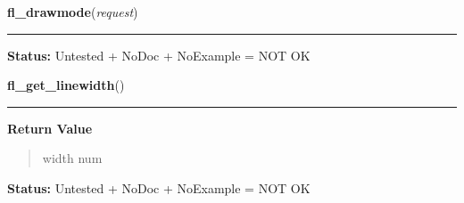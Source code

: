     \label{xformslib:library:fl_drawmode}

    \vspace{0.5ex}

\hspace{.8\funcindent}\begin{boxedminipage}{\funcwidth}

    \raggedright \textbf{fl\_drawmode}(\textit{request})

    \vspace{-1.5ex}

    \rule{\textwidth}{0.5\fboxrule}
\setlength{\parskip}{2ex}
\setlength{\parskip}{1ex}
\textbf{Status:} Untested + NoDoc + NoExample = NOT OK



    \end{boxedminipage}

    \label{xformslib:library:fl_get_linewidth}

    \vspace{0.5ex}

\hspace{.8\funcindent}\begin{boxedminipage}{\funcwidth}

    \raggedright \textbf{fl\_get\_linewidth}()

    \vspace{-1.5ex}

    \rule{\textwidth}{0.5\fboxrule}
\setlength{\parskip}{2ex}
\setlength{\parskip}{1ex}
      \textbf{Return Value}
    \vspace{-1ex}

      \begin{quote}
      width num

      \end{quote}

\textbf{Status:} Untested + NoDoc + NoExample = NOT OK



    \end{boxedminipage}

    \label{xformslib:library:fl_get_linestyle}

